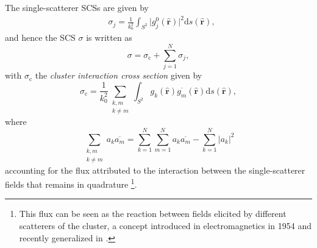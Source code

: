 \documentclass{article}
\begin{document}
The single-scatterer SCSs are given by
%
\begin{align}\label{iscs}
    &\sigma_j=\frac{1}{k_0^2}\int_{S^2}\lvert g_j^0(\hat{\mathbf{r}})\rvert ^2\mathrm{d}s(\hat{\mathbf{r}}),%
\end{align}
%
and hence the SCS $\sigma$ is written as
%
\begin{equation}
\label{decomp}
    \sigma=\sigma_\mathrm{c}+\sum_{j=1}^{N}\sigma_j,
\end{equation}
%
with $\sigma_\mathrm{c}$ the \emph{cluster interaction cross section} given by
%
\begin{equation}
\label{CICS}
    \sigma_\mathrm{c}=\frac{1}{k_0^2}\sum_{\substack{k,m\\k\ne m}}\int_{S^2} g_k(\hat{\mathbf{r}})\overline{g_m}(\hat{\mathbf{r}})\mathrm{d}s(\hat{\mathbf{r}}),
\end{equation}
%
where
%
\begin{equation*}
    \sum_{\substack{k,m\\k\ne m}}a_k\overline{a_m}=\sum_{k=1}^{N}\sum_{m=1}^{N}a_k\overline{a_m}-\sum_{k=1}^{N}\lvert a_k\rvert^2
\end{equation*}
accounting for the flux attributed to the interaction between the single-scatterer fields that remains in quadrature \cite{Stanzial, QAM1}\footnote{This flux can be seen as the reaction between fields elicited by different scatterers of the cluster, a concept introduced in electromagnetics in 1954 \cite{Rumsey} and recently generalized in \cite{Sihvola}.}.  
\end{document}
